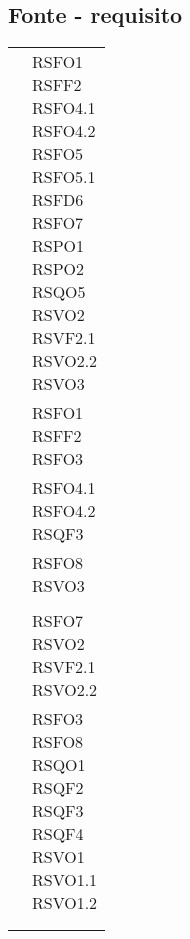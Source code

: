 {{{{\subsection{Fonte - requisito}\label{RequisitiTracciamentoDeiRequisitiFonteRequisito}
\def\tabularxcolumn#1{m{#1}}
{
	\begin{center}
		\renewcommand{\arraystretch}{1.4}
		\begin{longtable}{|p{7.5cm}|p{7.5cm}|}
		\hline
		\rowcolor{airforceblue}
		\makecell[c]{\textbf{Fonte}} & \makecell[c]{\textbf{Codice RS}}  \\
		\hline
		\makecell[c]{Capitolato} & \makecell[c]{RSFO1\\RSFF2\\RSFO4.1\\RSFO4.2\\RSFO5\\RSFO5.1\\RSFD6\\RSFO7\\RSPO1\\RSPO2\\RSQO5\\RSVO2\\RSVF2.1\\RSVO2.2\\RSVO3} \\
		\hline
		\makecell[c]{FC1.1} & \makecell[c]{RSFO1 \\ RSFF2 \\ RSFO3} \\
		\hline
		\makecell[c]{FC1.2} & \makecell[c]{RSFO4.1 \\ RSFO4.2 \\ RSQF3} \\
		\hline
		\makecell[c]{FC1.3} & \makecell[c]{RSFO8 \\ RSVO3} \\ 
		\hline
		\makecell[c]{FC2} & \makecell[c]{RSFD6} \\ 
		\hline
		\makecell[c]{FC3.1} & \makecell[c]{RSFO7 \\ RSVO2\\RSVF2.1\\RSVO2.2} \\
		\hline
		\makecell[c]{Interno} &\makecell[c]{RSFO3\\RSFO8\\RSQO1\\RSQF2\\RSQF3\\RSQF4\\RSVO1\\RSVO1.1\\RSVO1.2} \\
		\hline
		\makecell[c]{Verbale esterno 17-12-2020} & \makecell[c]{RSFO1} \\
		\hline
		\rowcolor{white}
		

\end{longtable}
\end{center}}}}}}
